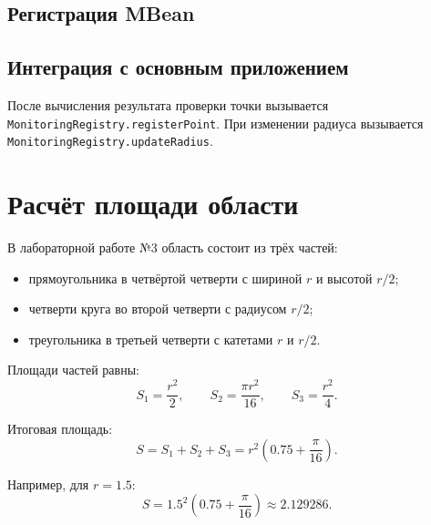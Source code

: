 \documentclass[a4paper,14pt]{extarticle}
\begin{document}
\subsection{Регистрация MBean}



\subsection{Интеграция с основным приложением}

После вычисления результата проверки точки вызывается \texttt{MonitoringRegistry.registerPoint}. При изменении радиуса вызывается \texttt{MonitoringRegistry.updateRadius}.



\section{Расчёт площади области}

В лабораторной работе №3 область состоит из трёх частей:
\begin{itemize}
    \item прямоугольника в четвёртой четверти с шириной $r$ и высотой $r/2$;
    \item четверти круга во второй четверти с радиусом $r/2$;
    \item треугольника в третьей четверти с катетами $r$ и $r/2$.
\end{itemize}

Площади частей равны:
\begin{equation*}
    S_1=\frac{r^2}{2}, \qquad
    S_2=\frac{\pi r^2}{16}, \qquad
    S_3=\frac{r^2}{4}.
\end{equation*}

Итоговая площадь:
\begin{equation*}
    S=S_1+S_2+S_3
     =r^2\left(0.75+\frac{\pi}{16}\right).
\end{equation*}

Например, для $r=1.5$:
\begin{equation*}
    S=1.5^2\left(0.75+\frac{\pi}{16}\right)\approx 2.129286.
\end{equation*}
\end{document}
